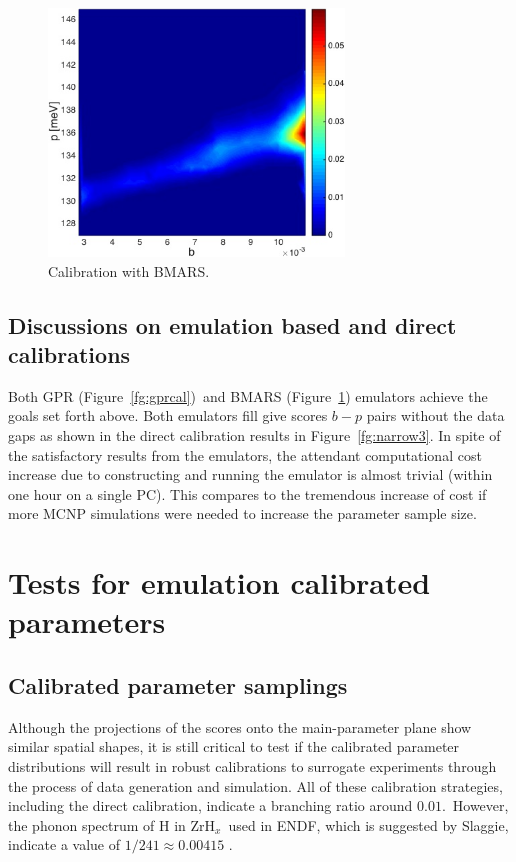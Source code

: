 \documentclass[review]{elsarticle}
\newcommand{\zh}{ZrH$_x$}
\begin{document}
\begin{figure}[ht!]
  \begin{center}
    \includegraphics[width=0.7\textwidth]{NSE15-48R1_Figure13.jpg}
    \caption[]{\label{fg:bmarscal}Calibration with BMARS.}%
  \end{center}
\end{figure}

\subsection{Discussions on emulation based and direct calibrations}
{Both GPR (Figure\ \ref{fg:gprcal})\ and BMARS (Figure\ \ref{fg:bmarscal}) emulators achieve the goals set forth above. Both emulators fill give scores $b-p$ pairs without the data gaps as shown in the direct calibration results in Figure\ \ref{fg:narrow3}. In spite of the satisfactory results from the emulators,  the attendant computational cost increase due to constructing and running the emulator is almost trivial (within one hour on a single PC). This compares to the tremendous increase of cost if more MCNP simulations were needed to increase the parameter sample size.}

\section{Tests for emulation calibrated parameters}
\subsection{Calibrated parameter samplings}
Although the projections of the scores onto the main-parameter plane show similar spatial shapes, it is still critical to test if the calibrated parameter distributions {will result in robust calibrations to surrogate experiments through the process of data generation and simulation.}
All of these calibration strategies, including the direct calibration, indicate a branching ratio around $0.01$.~However, the phonon spectrum of H in \zh~used in ENDF, which is suggested by Slaggie, indicate a value of $1/241 \approx 0.00415$ \cite{Slaggie}.
\end{document}
